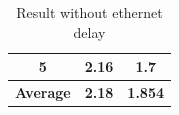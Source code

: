 \begin{table}[ht!]
{\begin{tabular}{|c|c|c|}
5                                                              & 2.16                                                                                                                                                & 1.7                                                                                                                                             \\ \hline 
\multicolumn{1}{|l|}{\textbf{Average}} & \textbf{2.18}                                                                                                                                       & \textbf{1.854}                                                                                                                                  \\ \hline
\end{tabular}
}
\caption{Result without ethernet delay}
\end{table}
